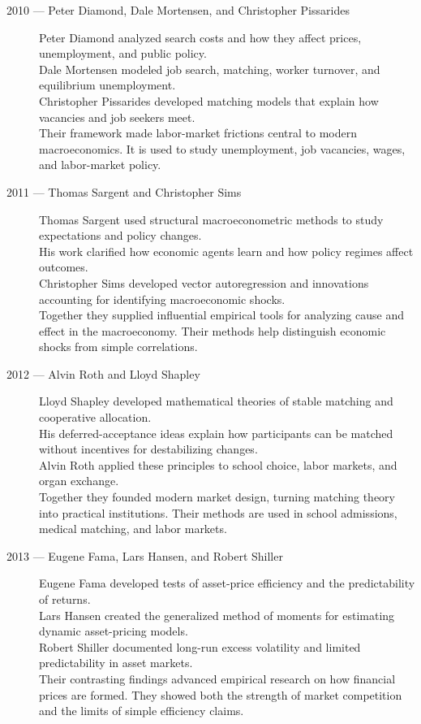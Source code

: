 \documentclass[12pt]{report}
\begin{document}
{\begin{description}
\item[2010 --- Peter Diamond, Dale Mortensen, and Christopher Pissarides]
Peter Diamond analyzed search costs and how they affect prices, unemployment, and public policy.\\
Dale Mortensen modeled job search, matching, worker turnover, and equilibrium unemployment.\\
Christopher Pissarides developed matching models that explain how vacancies and job seekers meet.\\
Their framework made labor-market frictions central to modern macroeconomics. It is used to study unemployment, job vacancies, wages, and labor-market policy.

\item[2011 --- Thomas Sargent and Christopher Sims]
Thomas Sargent used structural macroeconometric methods to study expectations and policy changes.\\
His work clarified how economic agents learn and how policy regimes affect outcomes.\\
Christopher Sims developed vector autoregression and innovations accounting for identifying macroeconomic shocks.\\
Together they supplied influential empirical tools for analyzing cause and effect in the macroeconomy. Their methods help distinguish economic shocks from simple correlations.

\item[2012 --- Alvin Roth and Lloyd Shapley]
Lloyd Shapley developed mathematical theories of stable matching and cooperative allocation.\\
His deferred-acceptance ideas explain how participants can be matched without incentives for destabilizing changes.\\
Alvin Roth applied these principles to school choice, labor markets, and organ exchange.\\
Together they founded modern market design, turning matching theory into practical institutions. Their methods are used in school admissions, medical matching, and labor markets.

\item[2013 --- Eugene Fama, Lars Hansen, and Robert Shiller]
Eugene Fama developed tests of asset-price efficiency and the predictability of returns.\\
Lars Hansen created the generalized method of moments for estimating dynamic asset-pricing models.\\
Robert Shiller documented long-run excess volatility and limited predictability in asset markets.\\
Their contrasting findings advanced empirical research on how financial prices are formed. They showed both the strength of market competition and the limits of simple efficiency claims.


\end{description}}
\end{document}

